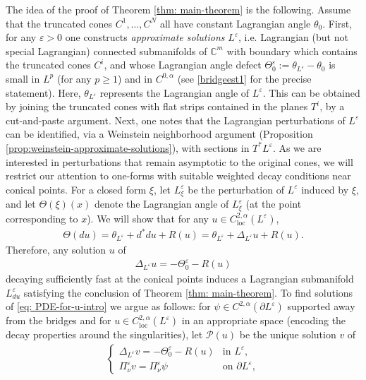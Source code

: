 \documentclass[11pt]{amsart}
\theoremstyle{definition}
\theoremstyle{remark}
\newcommand{\C}{\mathbb{C}}
\begin{document}
The idea of the proof of Theorem \ref{thm: main-theorem} is the following. Assume that the truncated cones $C^1,\ldots, C^N$ all have constant Lagrangian angle $\theta_0$.
First, for any $\varepsilon>0$ one constructs \emph{approximate solutions} $L^\varepsilon$, i.e. Lagrangian (but not special Lagrangian) connected submanifolds of $\C^m$ with boundary which contains the truncated cones $C^i$, and whose Lagrangian angle defect $\Theta_0^\varepsilon:=\theta_{L^\varepsilon}-\theta_0$ is small in $L^p$ (for any $p\geq 1$) and in $C^{0,\alpha}$ (see \eqref{bridgeest1} for the precise statement). Here, $\theta_{L^\varepsilon}$ represents the Lagrangian angle of $L^\varepsilon$. This can be obtained by joining the truncated cones with flat strips contained in the planes $T^i$, by a cut-and-paste argument.
Next, one notes that the Lagrangian perturbations of $L^\varepsilon$ can be identified, via a Weinstein neighborhood argument (Proposition \ref{prop:weinstein-approximate-solutions}), with sections in $T^\ast L^\varepsilon$. 
As we are interested in perturbations that remain asymptotic to the original cones, we will restrict our attention to one-forms with suitable weighted decay conditions near conical points. For a closed form $\xi$, let $L^\varepsilon_\xi$ be the perturbation of $L^\varepsilon$ induced by $\xi$, and let $\Theta(\xi)(x)$ denote the Lagrangian angle of $L^\varepsilon_\xi$ (at the point corresponding to $x$).
We will show that for any $u\in C^{2,\alpha}_{\text{loc}}(L^\varepsilon)$,
\begin{align*}
    \Theta(du)=\theta_{L^\varepsilon}+d^\ast du+R(u)=\theta_{L^\varepsilon}+\Delta_{L^\varepsilon}u+R(u).
\end{align*}
Therefore, any solution $u$ of
\begin{align}\label{eq: PDE-for-u-intro}
    \Delta_{L^\varepsilon}u=-\Theta_{0}^\varepsilon-R(u)
\end{align}
decaying sufficiently fast at the conical points induces a Lagrangian submanifold $L^\varepsilon_{du}$ satisfying the conclusion of Theorem \ref{thm: main-theorem}.
To find solutions of \eqref{eq: PDE-for-u-intro} we argue as follows: for $\psi\in C^{2,\alpha}(\partial L^\varepsilon)$ supported away from the bridges and for $u\in C^{2,\alpha}_{\text{loc}}(L^\varepsilon)$ in an appropriate space (encoding the decay properties around the singularities), let $\mathcal{P}(u)$ be the unique solution $v$ of
\begin{align*}
\begin{cases}
    \Delta_{L^\varepsilon} v=-\Theta_{0}^\varepsilon-R(u) & \text{in } L^\varepsilon,\\
    \Pi_\nu^\varepsilon v=\Pi_\nu^\varepsilon\psi & \text{on } \partial L^\varepsilon,
\end{cases}
\end{align*}
\end{document}

